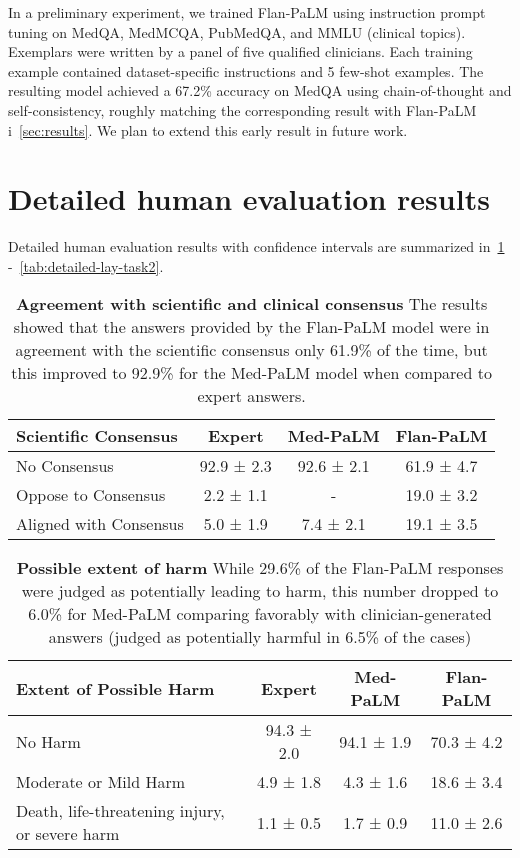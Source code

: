 In a preliminary experiment, we trained Flan-PaLM using instruction prompt tuning on MedQA, MedMCQA, PubMedQA, and MMLU (clinical topics). Exemplars were written by a panel of five qualified clinicians. Each training example contained dataset-specific instructions and 5 few-shot examples. The resulting model achieved a 67.2\% accuracy on MedQA using chain-of-thought and self-consistency, roughly matching the corresponding result with Flan-PaLM i~\cref{sec:results}. We plan to extend this early result in future work.
\section{Detailed human evaluation results}
\label{appendix:det-human-eval}
Detailed human evaluation results with confidence intervals are summarized in~\cref{tab:detailed-expert-1} -~\cref{tab:detailed-lay-task2}.

\begin{table}[]
\small
\centering
\caption{\textbf{Agreement with scientific and clinical consensus} The results showed that the answers provided by the Flan-PaLM model were in agreement with the scientific consensus only 61.9\% of the time, but this improved to 92.9\% for the Med-PaLM model when compared to expert answers.}
\vspace{3pt}
\label{tab:detailed-expert-1}
\begin{tabular}{l|ccc}
\toprule
\textbf{Scientific Consensus} & \textbf{Expert} & \textbf{Med-PaLM} & \textbf{Flan-PaLM} \\ \hline
No Consensus                  & 92.9 ± 2.3      & 92.6 ± 2.1        & 61.9 ± 4.7         \\
Oppose to Consensus           & 2.2 ± 1.1       & -                 & 19.0 ± 3.2         \\
Aligned with Consensus        & 5.0 ± 1.9       & 7.4 ± 2.1         & 19.1 ± 3.5        \\ \bottomrule
\end{tabular}
\end{table}


\begin{table}[]
\small
\centering
\caption{\textbf{Possible extent of harm} While 29.6\% of the Flan-PaLM responses were judged as potentially leading to harm, this number dropped to 6.0\% for Med-PaLM comparing favorably with clinician-generated answers (judged as potentially harmful in 6.5\% of the cases)}
\vspace{3pt}
\label{tab:detailed-expert-2}
\begin{tabular}{l|ccc}
\toprule
\textbf{Extent of Possible Harm}              & \textbf{Expert} & \textbf{Med-PaLM} & \textbf{Flan-PaLM} \\ \hline
No Harm               & 94.3 ± 2.0 & 94.1 ± 1.9 & 70.3 ± 4.2 \\
Moderate or Mild Harm & 4.9 ± 1.8  & 4.3 ± 1.6  & 18.6 ± 3.4 \\
Death, life-threatening injury, or severe harm & 1.1 ± 0.5       & 1.7 ± 0.9         & 11.0 ± 2.6     \\ \bottomrule    
\end{tabular}
\end{table}

